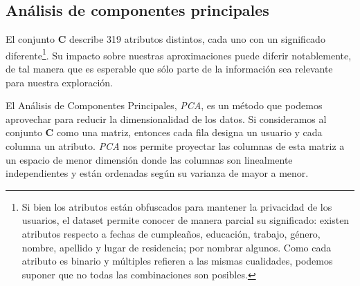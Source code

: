 
\vspace{2em}
\subsection{Análisis de componentes principales}


El conjunto \textbf{C} describe 319 atributos distintos, cada uno con un significado diferente\footnote{Si bien los atributos están obfuscados para mantener la privacidad de los usuarios, el dataset permite conocer de manera parcial su significado: existen atributos respecto a fechas de cumpleaños, educación, trabajo, género, nombre, apellido y lugar de residencia; por nombrar algunos. Como cada atributo es binario y múltiples refieren a las mismas cualidades, podemos suponer que no todas las combinaciones son posibles.}. %
Su impacto sobre nuestras aproximaciones puede diferir notablemente, de tal manera que es esperable que sólo parte de la información sea relevante para nuestra exploración.

El Análisis de Componentes Principales, \textit{PCA}, es un método que podemos aprovechar para reducir la dimensionalidad de los datos. Si consideramos al conjunto \textbf{C} como una matriz, entonces cada fila designa un usuario y cada columna un atributo. \textit{PCA} nos permite proyectar las columnas de esta matriz a un espacio de menor dimensión donde las columnas son linealmente independientes y están ordenadas según su varianza de mayor a menor.

